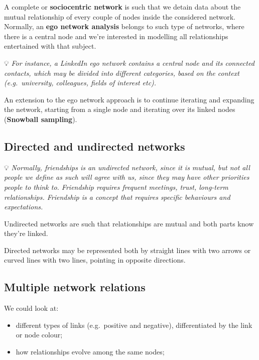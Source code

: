 \documentclass[
  notitlepage,
  onecolumn,
  openany]{book}
\providecommand{\tightlist}{%
  \setlength{\itemsep}{0pt}\setlength{\parskip}{0pt}}
\begin{document}
A complete or \textbf{sociocentric network} is such that we detain data about the mutual relationship of every couple of nodes inside the considered network. Normally, an \textbf{ego network analysis} belongs to such type of networks, where there is a central node and we're interested in modelling all relationships entertained with that subject.

💡 \emph{For instance, a LinkedIn ego network contains a central node and its connected contacts, which may be divided into different categories, based on the context (e.g.~university, colleagues, fields of interest etc).}

An extension to the ego network approach is to continue iterating and expanding the network, starting from a single node and iterating over its linked nodes (\textbf{Snowball sampling}).

\hypertarget{directed-and-undirected-networks}{%
\subsection{Directed and undirected networks}\label{directed-and-undirected-networks}}

💡 \emph{Normally, friendships is an undirected network, since it is mutual, but not all people we define as such will agree with us, since they may have other priorities people to think to.
Friendship requires frequent meetings, trust, long-term relationships. Friendship is a concept that requires specific behaviours and expectations.}

Undirected networks are such that relationships are mutual and both parts know they're linked.

Directed networks may be represented both by straight lines with two arrows or curved lines with two lines, pointing in opposite directions.

\hypertarget{multiple-network-relations}{%
\subsection{Multiple network relations}\label{multiple-network-relations}}

We could look at:

\begin{itemize}
\tightlist
\item
  different types of links (e.g.~positive and negative), differentiated by the link or node colour;
\item
  how relationships evolve among the same nodes;
\end{itemize}
\end{document}
